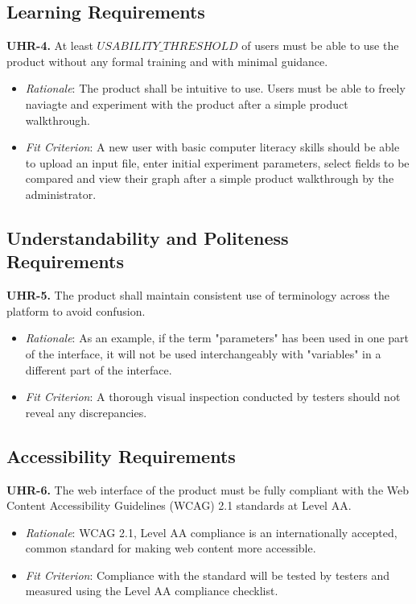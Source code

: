 \documentclass[12pt]{article}
\begin{document}
\subsection{Learning Requirements}
\textbf{UHR-4.} At least $USABILITY\_THRESHOLD$ of users must be able to use the product without any formal training and with minimal guidance.
\begin{itemize}
  \item \emph{Rationale}: The product shall be intuitive to use. Users must be able to freely naviagte and experiment with the product after a simple product walkthrough.
  \item \emph{Fit Criterion}: A new user with basic computer literacy skills should be able to upload an input file, enter initial experiment parameters, select fields to be compared and view their graph
  after a simple product walkthrough by the administrator.
\end{itemize}

\subsection{Understandability and Politeness Requirements}
\textbf{UHR-5.} The product shall maintain consistent use of terminology across the platform to avoid confusion.
\begin{itemize}
  \item \emph{Rationale}: As an example, if the term "parameters" has been used in one part of the interface, it will not be used interchangeably with "variables" in a different part of the interface.
  \item \emph{Fit Criterion}: A thorough visual inspection conducted by testers should not reveal any discrepancies.
\end{itemize}

\subsection{Accessibility Requirements}
\textbf{UHR-6.} The web interface of the product must be fully compliant with the Web Content Accessibility Guidelines (WCAG) 2.1 standards at Level AA.
\begin{itemize}
  \item \emph{Rationale}: WCAG 2.1, Level AA compliance is an internationally accepted, common standard for making web content more accessible.
  \item \emph{Fit Criterion}: Compliance with the standard will be tested by testers and measured using the Level AA compliance checklist.
\end{itemize}
\end{document}
